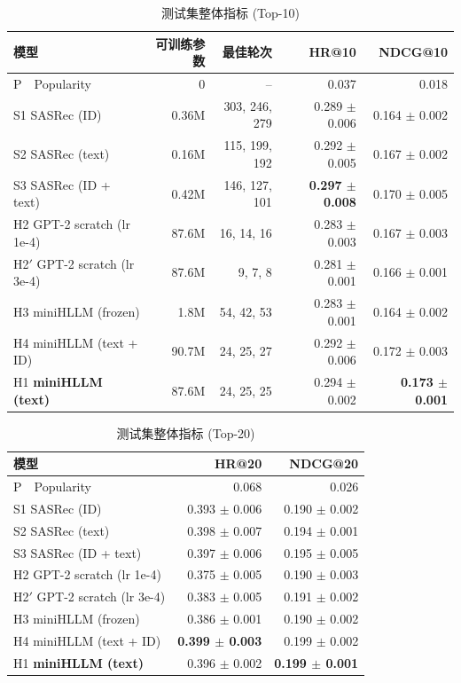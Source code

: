 \documentclass{article}
\begin{document}
\begin{table}[htbp]
\centering
\caption{测试集整体指标 (Top-10)}
\label{tab:main}
\footnotesize
\begin{tabular}{lrrrr}
\toprule
模型 & 可训练参数 & 最佳轮次 & HR@10 & NDCG@10 \\
\midrule
P\ \ Popularity & 0 & -- & 0.037 & 0.018 \\
S1 SASRec (ID) & 0.36M & 303, 246, 279 & 0.289 $\pm$ 0.006 & 0.164 $\pm$ 0.002 \\
S2 SASRec (text) & 0.16M & 115, 199, 192 & 0.292 $\pm$ 0.005 & 0.167 $\pm$ 0.002 \\
S3 SASRec (ID + text) & 0.42M & 146, 127, 101 & \textbf{0.297 $\pm$ 0.008} & 0.170 $\pm$ 0.005 \\
H2 GPT-2 scratch (lr 1e-4) & 87.6M & 16, 14, 16 & 0.283 $\pm$ 0.003 & 0.167 $\pm$ 0.003 \\
H2$'$ GPT-2 scratch (lr 3e-4) & 87.6M & 9, 7, 8 & 0.281 $\pm$ 0.001 & 0.166 $\pm$ 0.001 \\
H3 miniHLLM (frozen) & 1.8M & 54, 42, 53 & 0.283 $\pm$ 0.001 & 0.164 $\pm$ 0.002 \\
H4 miniHLLM (text + ID) & 90.7M & 24, 25, 27 & 0.292 $\pm$ 0.006 & 0.172 $\pm$ 0.003 \\
H1 \textbf{miniHLLM (text)} & 87.6M & 24, 25, 25 & 0.294 $\pm$ 0.002 & \textbf{0.173 $\pm$ 0.001} \\
\bottomrule
\end{tabular}
\end{table}

\begin{table}[htbp]
\centering
\caption{测试集整体指标 (Top-20)}
\label{tab:main20}
\footnotesize
\begin{tabular}{lrr}
\toprule
模型 & HR@20 & NDCG@20 \\
\midrule
P\ \ Popularity & 0.068 & 0.026 \\
S1 SASRec (ID) & 0.393 $\pm$ 0.006 & 0.190 $\pm$ 0.002 \\
S2 SASRec (text) & 0.398 $\pm$ 0.007 & 0.194 $\pm$ 0.001 \\
S3 SASRec (ID + text) & 0.397 $\pm$ 0.006 & 0.195 $\pm$ 0.005 \\
H2 GPT-2 scratch (lr 1e-4) & 0.375 $\pm$ 0.005 & 0.190 $\pm$ 0.003 \\
H2$'$ GPT-2 scratch (lr 3e-4) & 0.383 $\pm$ 0.005 & 0.191 $\pm$ 0.002 \\
H3 miniHLLM (frozen) & 0.386 $\pm$ 0.001 & 0.190 $\pm$ 0.002 \\
H4 miniHLLM (text + ID) & \textbf{0.399 $\pm$ 0.003} & 0.199 $\pm$ 0.002 \\
H1 \textbf{miniHLLM (text)} & 0.396 $\pm$ 0.002 & \textbf{0.199 $\pm$ 0.001} \\
\bottomrule
\end{tabular}
\end{table}
\end{document}
